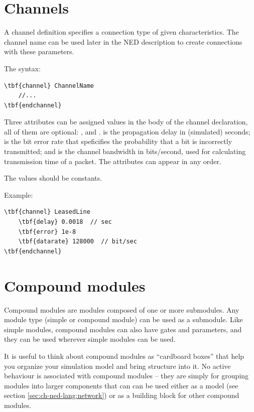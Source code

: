 \section{Channels}

A channel definition specifies a connection type of given characteristics.
The channel name can be used later in the NED description to
create connections with these parameters.

The syntax:

\begin{Verbatim}[commandchars=\\\{\}]
\tbf{channel} ChannelName
    //...
\tbf{endchannel}
\end{Verbatim}

Three attributes can be assigned values in the body of the channel declaration,
all of them are optional: ,  and .
 is the propagation delay in (simulated) seconds;
 is the bit error rate that speficifies the probability
that a bit is incorrectly transmitted; and 
is the channel bandwidth in bits/second, used for calculating
transmission time of a packet. The attributes can appear
in any order.

The values should be constants.

Example:

\begin{Verbatim}[commandchars=\\\{\}]
\tbf{channel} LeasedLine
    \tbf{delay} 0.0018  // sec
    \tbf{error} 1e-8
    \tbf{datarate} 128000  // bit/sec
\tbf{endchannel}
\end{Verbatim}




\section{Compound modules}

Compound modules are modules composed of one or more submodules.
Any module type (simple or compound module) can be used as a submodule.
Like simple modules, compound modules can also have gates and parameters,
and they can be used wherever simple modules can be used.

It is useful to think about compound modules as ``cardboard boxes''
that help you organize your simulation model and bring structure into
it. No active behaviour is associated with compound modules -- they
are simply for grouping modules into larger components that can
can be used either as a model (see section \ref{sec:ch-ned-lang:network})
or as a building block for other compound modules.

